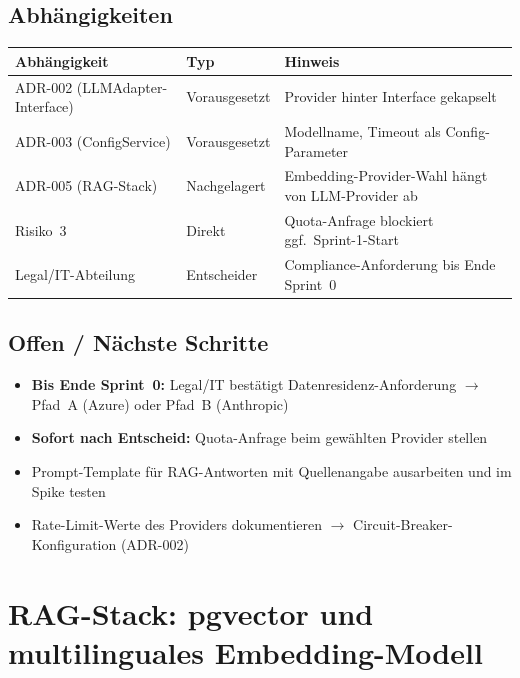 \documentclass[a4paper, 11pt, oneside]{report}
\newcommand{\ra}{$\rightarrow$\xspace}
\newcommand{\todo}{$\square$\;}
\begin{document}
\section{Abhängigkeiten}

\begin{table}[htb]
\small\centering
\begin{tabularx}{\linewidth}{L{4cm} L{3cm} X}
\toprule
{}
\textbf{Abhängigkeit} & \textbf{Typ} & \textbf{Hinweis} \\
\midrule
ADR-002 (LLMAdapter-Interface) & Vorausgesetzt  & Provider hinter Interface gekapselt \\
ADR-003 (ConfigService)        & Vorausgesetzt  & Modellname, Timeout als Config-Parameter \\
ADR-005 (RAG-Stack)            & Nachgelagert   & Embedding-Provider-Wahl hängt von LLM-Provider ab \\
Risiko~3                       & Direkt         & Quota-Anfrage blockiert ggf.\ Sprint-1-Start \\
Legal/IT-Abteilung             & Entscheider    & Compliance-Anforderung bis Ende Sprint~0 \\
\bottomrule
\end{tabularx}
\end{table}

\section{Offen / Nächste Schritte}

\begin{itemize}[label=\todo]
  \item \textbf{Bis Ende Sprint~0:} Legal/IT bestätigt Datenresidenz-Anforderung
        \ra Pfad~A (Azure) oder Pfad~B (Anthropic)
  \item \textbf{Sofort nach Entscheid:} Quota-Anfrage beim gewählten Provider stellen
  \item Prompt-Template für RAG-Antworten mit Quellenangabe ausarbeiten und im Spike testen
  \item Rate-Limit-Werte des Providers dokumentieren \ra Circuit-Breaker-Konfiguration (ADR-002)
\end{itemize}

\chapter{RAG-Stack: pgvector und multilinguales Embedding-Modell}
\label{chap:adr005}
\end{document}
